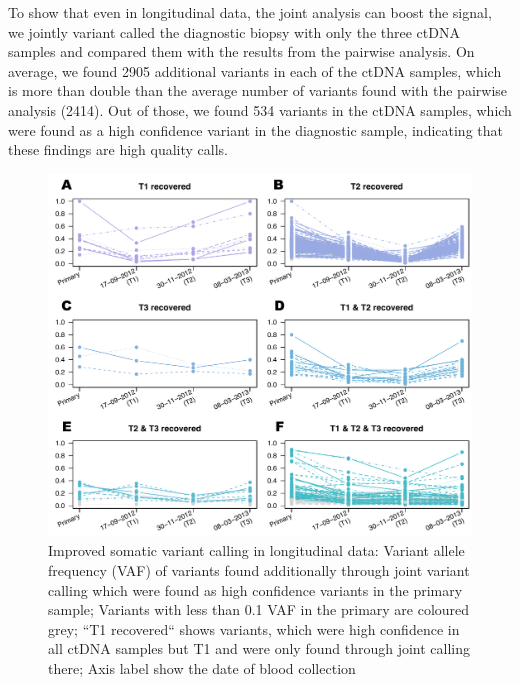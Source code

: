 To show that even in longitudinal data, the joint analysis can boost the signal, we jointly variant called the diagnostic biopsy with only the three ctDNA samples and compared them with the results from the pairwise analysis. On average, we found 2905 additional variants in each of the ctDNA samples, which is more than double than the average number of variants found with the pairwise analysis (2414). Out of those, we found 534 variants in the ctDNA samples, which were found as a high confidence variant in the diagnostic sample, indicating that these findings are high quality calls. 

\begin{figure}[!ht]
\centering
\includegraphics[width=.99\linewidth]{Figures/longitudinalCA9ctDNAVafs.pdf}
\caption[Improved somatic variant calling in longitudinal data]{Improved somatic variant calling in longitudinal data: Variant allele frequency (VAF) of variants found additionally through joint variant calling which were found as high confidence variants in the primary sample; Variants with less than 0.1 VAF in the primary are coloured grey; ``T1 recovered`` shows variants, which were high confidence in all ctDNA samples but T1 and were only found through joint calling there; Axis label show the date of blood collection }\label{fig:longitudinalVAFsctDNA}
\end{figure}

